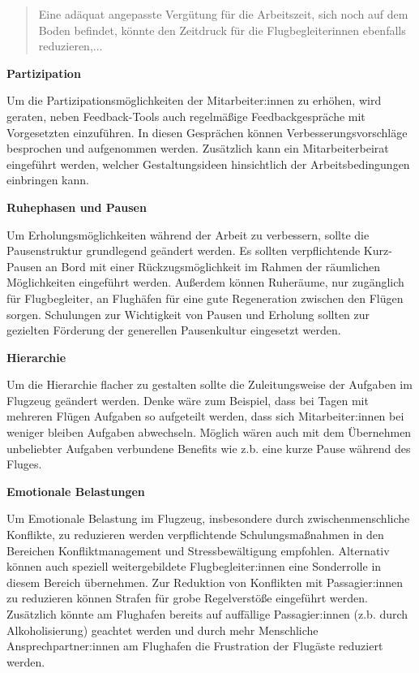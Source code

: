 \documentclass[12pt, a4paper]{article}
\begin{document}
\blockquote{
\tiny
Eine adäquat angepasste Vergütung für die Arbeitszeit, sich noch auf dem Boden befindet, 
könnte den Zeitdruck für die Flugbegleiterinnen ebenfalls reduzieren,... }

\textbf{Partizipation}

Um die Partizipationsmöglichkeiten der Mitarbeiter:innen zu erhöhen, 
wird geraten, neben Feedback-Tools auch regelmäßige Feedbackgespräche mit Vorgesetzten einzuführen. 
In diesen Gesprächen können Verbesserungsvorschläge besprochen und aufgenommen werden. 
Zusätzlich kann ein Mitarbeiterbeirat eingeführt werden, welcher Gestaltungsideen 
hinsichtlich der Arbeitsbedingungen einbringen kann.

\textbf{Ruhephasen und Pausen}

Um Erholungsmöglichkeiten während der Arbeit zu verbessern, sollte die Pausenstruktur grundlegend geändert werden. 
Es sollten verpflichtende Kurz-Pausen an Bord mit einer Rückzugsmöglichkeit im Rahmen der räumlichen 
Möglichkeiten eingeführt werden. Außerdem können Ruheräume, nur zugänglich für Flugbegleiter, 
an Flughäfen für eine gute Regeneration zwischen den Flügen sorgen. Schulungen zur Wichtigkeit von 
Pausen und Erholung sollten zur gezielten Förderung der generellen Pausenkultur eingesetzt werden.

\textbf{Hierarchie}

Um die Hierarchie flacher zu gestalten sollte die Zuleitungsweise der Aufgaben im Flugzeug geändert werden. Denke wäre zum Beispiel, dass 
bei Tagen mit mehreren Flügen Aufgaben so aufgeteilt werden, dass sich Mitarbeiter:innen bei weniger bleiben Aufgaben abwechseln.
Möglich wären auch mit dem Übernehmen unbeliebter Aufgaben verbundene Benefits wie z.b. eine kurze Pause während des Fluges. 

\textbf{Emotionale Belastungen}

Um Emotionale Belastung im Flugzeug, insbesondere durch zwischenmenschliche Konflikte, 
zu reduzieren werden verpflichtende Schulungsmaßnahmen in den Bereichen Konfliktmanagement und Stressbewältigung empfohlen. 
Alternativ können auch speziell weitergebildete Flugbegleiter:innen eine Sonderrolle in diesem Bereich übernehmen.
Zur Reduktion von Konflikten mit Passagier:innen zu reduzieren können Strafen für grobe Regelverstöße eingeführt werden.
Zusätzlich könnte am Flughafen bereits auf auffällige Passagier:innen (z.b. durch Alkoholisierung) geachtet werden und durch mehr
Menschliche Ansprechpartner:innen am Flughafen die Frustration der Flugäste reduziert werden. 
\end{document}
